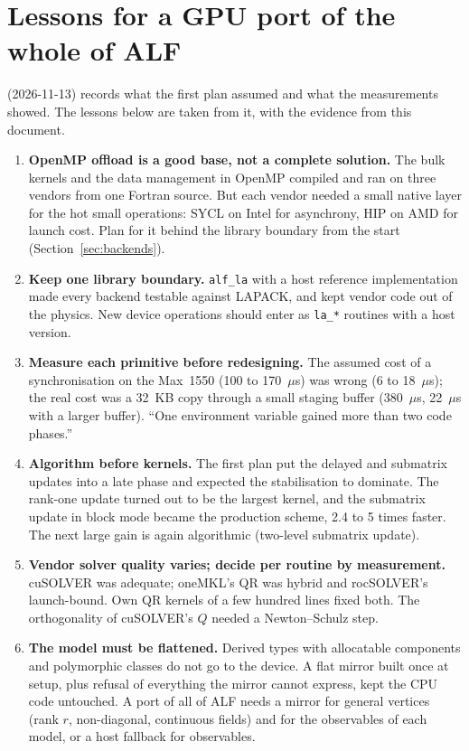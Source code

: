 \section{Lessons for a GPU port of the whole of ALF}
\label{sec:lessons}

 (2026-11-13) records what the first plan assumed and what the measurements showed. The lessons below are taken from it, with the evidence from this document.

\begin{enumerate}
\item \textbf{OpenMP offload is a good base, not a complete solution.} The bulk kernels and the data management in OpenMP compiled and ran on three vendors from one Fortran source. But each vendor needed a small native layer for the hot small operations: SYCL on Intel for asynchrony, HIP on AMD for launch cost. Plan for it behind the library boundary from the start (Section~\ref{sec:backends}).
\item \textbf{Keep one library boundary.} \texttt{alf\_la} with a host reference implementation made every backend testable against LAPACK, and kept vendor code out of the physics. New device operations should enter as \texttt{la\_*} routines with a host version.
\item \textbf{Measure each primitive before redesigning.} The assumed cost of a synchronisation on the Max~1550 (100 to 170~$\mu$s) was wrong (6 to 18~$\mu$s); the real cost was a 32~KB copy through a small staging buffer (380~$\mu$s, 22~$\mu$s with a larger buffer). ``One environment variable gained more than two code phases.''
\item \textbf{Algorithm before kernels.} The first plan put the delayed and submatrix updates into a late phase and expected the stabilisation to dominate. The rank-one update turned out to be the largest kernel, and the submatrix update in block mode became the production scheme, 2.4 to 5 times faster. The next large gain is again algorithmic (two-level submatrix update).
\item \textbf{Vendor solver quality varies; decide per routine by measurement.} cuSOLVER was adequate; oneMKL's QR was hybrid and rocSOLVER's launch-bound. Own QR kernels of a few hundred lines fixed both. The orthogonality of cuSOLVER's $Q$ needed a Newton--Schulz step.
\item \textbf{The model must be flattened.} Derived types with allocatable components and polymorphic classes do not go to the device. A flat mirror built once at setup, plus refusal of everything the mirror cannot express, kept the CPU code untouched. A port of all of ALF needs a mirror for general vertices (rank $r$, non-diagonal, continuous fields) and for the observables of each model, or a host fallback for observables.

\end{enumerate}
